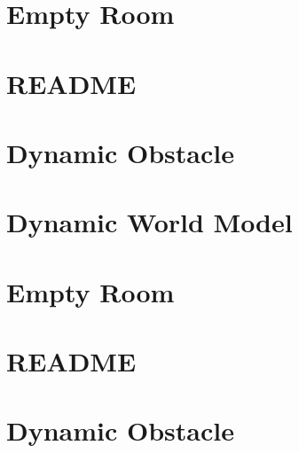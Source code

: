 \documentclass[twoside]{book}
\newcommand{\+}{\discretionary{\mbox{\scriptsize$\hookleftarrow$}}{}{}}
\begin{document}
\chapter{Empty Room}
\label{md_smacc2_sm_reference_library_sm_dance_bot_models_empty_room_README}

\chapter{README}
\label{md_smacc2_sm_reference_library_sm_dance_bot_README}

\chapter{Dynamic Obstacle}
\label{md_smacc2_sm_reference_library_sm_dance_bot_strikes_back_models_dynamic_obstacle_README}

\chapter{Dynamic World Model}
\label{md_smacc2_sm_reference_library_sm_dance_bot_strikes_back_models_dynamic_world_README}

\chapter{Empty Room}
\label{md_smacc2_sm_reference_library_sm_dance_bot_strikes_back_models_empty_room_README}

\chapter{README}
\label{md_smacc2_sm_reference_library_sm_dance_bot_strikes_back_README}

\chapter{Dynamic Obstacle}
\label{md_smacc2_sm_reference_library_sm_dance_bot_warehouse_models_dynamic_obstacle_copy_README}

\end{document}
